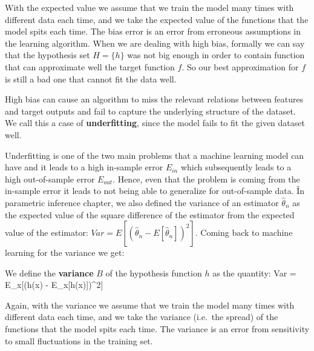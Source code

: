 With the expected value we assume that we train the model many times with different data each time, and we take the
expected value of the functions that the model spits each time. The bias error is an error from erroneous assumptions
in the learning algorithm. When we are dealing with high bias, formally we can say that the hypothesis set $H=\{h\}$
was not big enough in order to contain function that can approximate well the target function $f$. So our best
approximation for $f$ is still a bad one that cannot fit the data well.

\vspace{-5pt}


\vspace{-5pt}

High bias can cause an algorithm to miss the relevant relations between features and target outputs and fail to
capture the underlying structure of the dataset. We call this a case of \textbf{underfitting}, since the model fails
to fit the given dataset well.

\vspace{-10pt}


\vspace{-10pt}

Underfitting is one of the two main problems that a machine learning model can have and it leads to a high in-sample
error $E_{in}$ which subsequently leads to a high out-of-sample error $E_{out}$. Hence, even that the problem is
coming from the in-sample error it leads to not being able to generalize for out-of-sample data. \v

In parametric inference chapter, we also defined the variance of an estimator $\hat{\theta}_{n}$ as the expected
value of the square difference of the estimator from the expected value of the estimator: $Var = E[(\hat{\theta}_{n}
- E[\hat{\theta}_{n}])^2]$. Coming back to machine learning for the variance we get:

\bd[Variance]
We define the \textbf{variance} $B$ of the hypothesis function $h$ as the quantity:
\bse
Var = E_{x}[(h(x) - E_{x}[h(x)])^2]
\ese
\ed

Again, with the variance we assume that we train the model many times with different data each time, and we take the
variance (i.e.\ the spread) of the functions that the model spits each time. The variance is an error from
sensitivity to small fluctuations in the training set.

